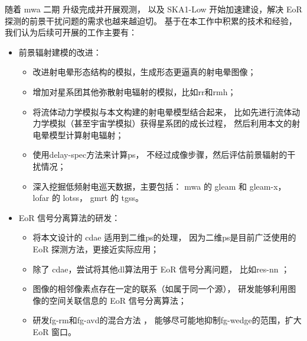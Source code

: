 \begin{summary}
随着 \ac{mwa} 二期 \cite{wayth2018} 升级完成并开展观测，
以及 SKA1-Low 开始加速建设，解决 EoR 探测的前景干扰问题的需求也越来越迫切。
基于在本工作中积累的技术和经验，我们认为后续可开展的工作主要有：
\begin{itemize}
\item 前景辐射建模的改进：
  \begin{itemize}
    \item 改进射电晕形态结构的模拟，生成形态更逼真的射电晕图像；
    \item 增加对星系团其他弥散射电辐射的模拟，比如\ac{rr}和\ac{rmh}；
    \item 将流体动力学模拟与本文构建的射电晕模型结合起来，
      比如先进行流体动力学模拟（甚至宇宙学模拟）获得星系团的成长过程，
      然后利用本文的射电晕模型计算射电辐射；
    \item 使用\ac{delay-spec}方法\cite{parsons2012}来计算\ac{ps}，
      不经过成像步骤，然后评估前景辐射的干扰情况；
    \item 深入挖掘低频射电巡天数据，主要包括：
      \ac{mwa} 的 \ac{gleam}\cite{wayth2015,hurleyWalker2017}
      和 \ac{gleam-x}\cite{hurleyWalker2017prop}，
      \ac{lofar} 的 \ac{lotss}\cite{shimwell2017,shimwell2019}，
      \ac{gmrt} 的 \ac{tgss}\cite{intema2017}。
  \end{itemize}

\item EoR 信号分离算法的研发：
  \begin{itemize}
    \item 将本文设计的 \ac{cdae} 适用到二维\ac{ps}的处理，
      因为二维\ac{ps}是目前广泛使用的 EoR 探测方法，更接近实际应用；
    \item 除了 \ac{cdae}，尝试将其他\ac{dl}算法用于 EoR 信号分离问题，
      比如\ac{res-nn} \cite{he2016}；
    \item 图像的相邻像素点存在一定的联系（如属于同一个源），
      研发能够利用图像的空间关联信息的 EoR 信号分离算法；
    \item 研发\ac{fg-rm}和\ac{fg-avd}的混合方法 \cite{kerrigan2018}，
      能够尽可能地抑制\ac{fg-wedge}的范围，扩大 EoR 窗口。
  \end{itemize}
\end{itemize}

\end{summary}
